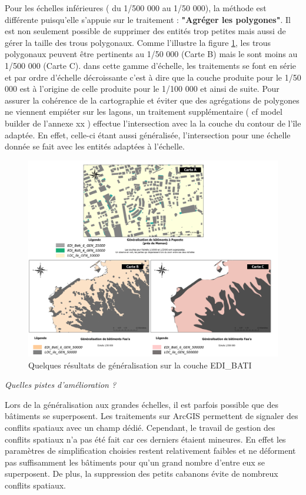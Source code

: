 Pour les échelles inférieures ( du 1/500 000 au 1/50 000), la méthode est différente puisqu'elle s'appuie sur le traitement : \textbf{"Agréger les polygones"}. Il est non seulement possible de supprimer des entités trop petites mais aussi de gérer la taille des trous polygonaux. Comme l'illustre la figure  \ref{resultat_bati}, les trous polygonaux peuvent être pertinents au 1/50 000 (Carte B) mais le sont moins au 1/500 000 (Carte C).
dans cette gamme d'échelle, les traitements se font en série et par ordre d'échelle décroissante c'est à dire que la couche produite pour le 1/50 000 est à l'origine de celle produite pour le 1/100 000 et ainsi de suite. Pour assurer la cohérence de la cartographie et éviter que des agrégations de polygones ne viennent empiéter sur les lagons, un traitement supplémentaire ( cf model builder de l'annexe xx ) effectue l'intersection avec la la couche du contour de l'île adaptée. En effet, celle-ci étant aussi généralisée, l'intersection pour une échelle donnée se fait avec les entités adaptées à l'échelle.


\begin{figure}[ht]
\centering
\includegraphics[width=\linewidth]{images/chap1/resultat_bati_bis.png}
\caption{Quelques résultats de généralisation sur la couche EDI\_BATI}
\label{resultat_bati}
\end{figure}

\begin{center}
    \textit{Quelles pistes d'amélioration ?}
\end{center}

Lors de la généralisation aux grandes échelles, il est parfois possible que des bâtiments se superposent. Les traitements sur ArcGIS permettent de signaler des conflits spatiaux avec un champ dédié. Cependant, le travail de gestion des conflits spatiaux n'a pas été fait car ces derniers étaient mineures. En effet les paramètres de simplification choisies restent relativement faibles et ne déforment pas suffisamment les bâtiments pour qu'un grand nombre d'entre eux se superposent. De plus, la suppression des petits cabanons évite de nombreux conflits spatiaux.

